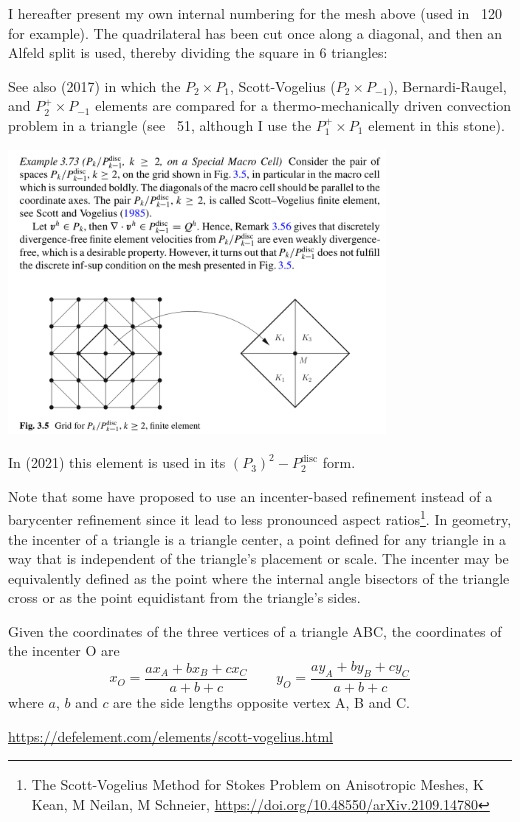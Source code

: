 I hereafter present my own internal numbering for the mesh above (used in \stone~120 for example).
The quadrilateral has been cut once along a diagonal, and then an Alfeld split is used, thereby 
dividing the square in 6 triangles:



See also \textcite{jolm17} (2017) in which the $P_2\times P_1$, Scott-Vogelius ($P_2\times P_{-1}$), 
Bernardi-Raugel, and $P_2^+\times P_{-1}$ elements 
are compared for a thermo-mechanically driven convection problem in a triangle (see \stone~51, 
although I use the $P_1^+\times P_1$ element in this stone).


\begin{center}
\includegraphics[width=10cm]{images/pair_scott_vogelius/john_scott_vogelius}\\
\end{center}


In \textcite{befh21} (2021) this element is used in its 
$(P_3)^2-P_2^{\text{disc}}$ form.

Note that some have proposed to use an incenter-based refinement instead of
a barycenter refinement since it lead to less pronounced aspect ratios\footnote{
The Scott-Vogelius Method for Stokes Problem on Anisotropic Meshes, K Kean, M Neilan, M Schneier,
\url{https://doi.org/10.48550/arXiv.2109.14780}}.
In geometry, the incenter of a triangle is a triangle center, a point defined for 
any triangle in a way that is independent of the triangle's placement or scale. 
The incenter may be equivalently defined as the point where the internal angle bisectors 
of the triangle cross or as the point equidistant from the triangle's sides.

Given the coordinates of the three vertices of a triangle ABC,
the coordinates of the incenter O are
\[
x_O=\frac{ax_A+bx_B+cx_C}{a+b+c}
\qquad
y_O=\frac{ay_A+by_B+cy_C}{a+b+c}
\] 
where $a$, $b$ and $c$ are the side lengths opposite vertex A, B and C.

 


\begin{center}
\url{https://defelement.com/elements/scott-vogelius.html}
\end{center}


